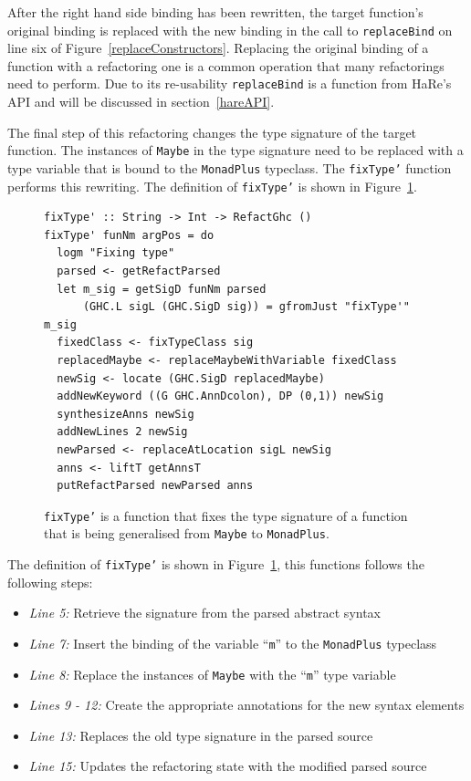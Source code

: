 After the right hand side binding has been rewritten, the target function's original binding is replaced with the new binding in the call to \texttt{replaceBind} on line six of Figure~\ref{replaceConstructors}. Replacing the original binding of a function with a refactoring one is a common operation that many refactorings need to perform. Due to its re-usability \texttt{replaceBind} is a function from HaRe's API and will be discussed in section~\ref{hareAPI}. 

The final step of this refactoring changes the type signature of the target function. The instances of \texttt{Maybe} in the type signature need to be replaced with a type variable that is bound to the \texttt{MonadPlus} typeclass. The \texttt{fixType'} function performs this rewriting. The definition of \texttt{fixType'} is shown in Figure~\ref{fixTypePrime}.

\begin{figure}[t]
\begin{lstlisting}
fixType' :: String -> Int -> RefactGhc ()
fixType' funNm argPos = do
  logm "Fixing type"
  parsed <- getRefactParsed
  let m_sig = getSigD funNm parsed
      (GHC.L sigL (GHC.SigD sig)) = gfromJust "fixType'" m_sig
  fixedClass <- fixTypeClass sig
  replacedMaybe <- replaceMaybeWithVariable fixedClass
  newSig <- locate (GHC.SigD replacedMaybe)
  addNewKeyword ((G GHC.AnnDcolon), DP (0,1)) newSig
  synthesizeAnns newSig
  addNewLines 2 newSig
  newParsed <- replaceAtLocation sigL newSig
  anns <- liftT getAnnsT
  putRefactParsed newParsed anns         
\end{lstlisting}
\caption{\texttt{fixType'} is a function that fixes the type signature of a function that is being generalised from \texttt{Maybe} to \texttt{MonadPlus}.}
\label{fixTypePrime}
\end{figure}

The definition of \texttt{fixType'} is shown in Figure~\ref{fixTypePrime}, this functions follows the following steps:

\begin{itemize}
\item \textit{Line 5:} Retrieve the signature from the parsed abstract syntax
\item \textit{Line 7:} Insert the binding of the variable ``\texttt{m}'' to the \texttt{MonadPlus} typeclass
\item \textit{Line 8:} Replace the instances of \texttt{Maybe} with the ``\texttt{m}'' type variable
\item \textit{Lines 9 - 12:} Create the appropriate annotations for the new syntax elements
\item \textit{Line 13:} Replaces the old type signature in the parsed source
\item \textit{Line 15:} Updates the refactoring state with the modified parsed source
\end{itemize}

